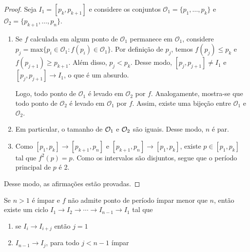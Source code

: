 \begin{proof}
Seja $I_1 = [p_k,  p_{k+1}]$ e considere os conjuntos $\mathcal{O}_1 = \{p_1, \dots, p_k\}$ e $\mathcal{O}_2 = \{p_{k+1}, \dots, p_n\}$. 
\begin{enumerate}
\item Se $f$ calculada em algum ponto de $\mathcal{O}_1$ permanece em $\mathcal{O}_1$, considere $p_j = \textrm{max}\{p_i \in \mathcal{O}_1 : f(p_i) \in \mathcal{O}_1\}$. Por definição de $p_j$, temos $f(p_j) \leq p_k$ e $f(p_{j+1}) \geq p_{k+1}$. Além disso, $p_j < p_k$. Desse modo, $[p_j, p_{j+1}] \neq I_1$ e $[p_j, p_{j+1}] \longrightarrow I_1$, o que é um absurdo.

Logo, todo ponto de $\mathcal{O}_1$ é levado em $\mathcal{O}_2$ por $f$. Analogamente, mostra-se que todo ponto de $\mathcal{O}_2$ é levado em $\mathcal{O}_1$ por $f$. Assim, existe uma bijeção entre $\mathcal{O}_1$ e $\mathcal{O}_2$.

\item Em particular, o tamanho de $\mathcal{O}_1$ e $\mathcal{O}_2$ são iguais. Desse modo, $n$ é par.

\item Como $[p_1, p_k] \longrightarrow [p_{k+1}, p_n]$ e $[p_{k+1}, p_n] \longrightarrow [p_1, p_k]$, existe $p \in [p_1, p_k]$ tal que $f^2(p) = p$. Como os intervalos são disjuntos, segue que o período principal de $p$ é 2.
\end{enumerate}
Desse modo, as afirmações estão provadas.
\end{proof}

\begin{lemma}
Se $n > 1$ é ímpar e $f$ não admite ponto de período ímpar menor que $n$, então existe um ciclo $I_1 \longrightarrow I_2 \longrightarrow \cdots \longrightarrow I_{n-1} \longrightarrow I_1$ tal que
\begin{enumerate}
\item se $I_i \longrightarrow I_{i+j}$ então $j = 1$
\item $I_{n-1} \longrightarrow I_j$, para todo $j < n-1$ ímpar
\end{enumerate} 
\end{lemma}

